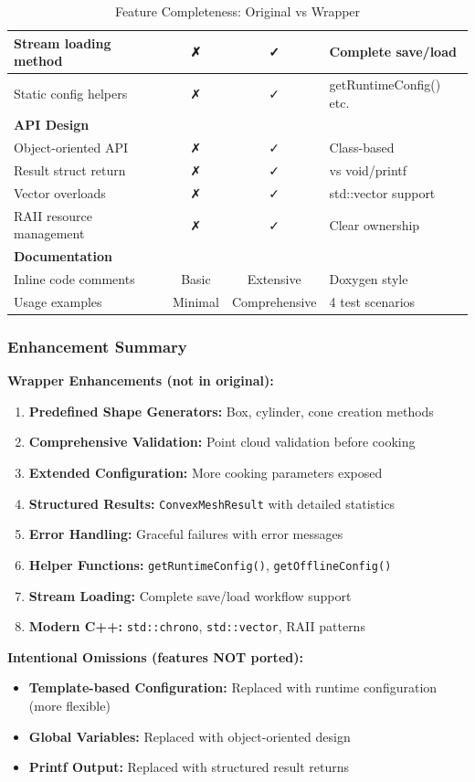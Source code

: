 \begin{table}[h]
\begin{tabular}{|p{6cm}|c|c|l|}
\hline
Stream loading method & ✗ & ✓ & Complete save/load \\
\hline
Static config helpers & ✗ & ✓ & getRuntimeConfig() etc. \\
\hline
\textbf{API Design} & & & \\
\hline
Object-oriented API & ✗ & ✓ & Class-based \\
\hline
Result struct return & ✗ & ✓ & vs void/printf \\
\hline
Vector overloads & ✗ & ✓ & std::vector support \\
\hline
RAII resource management & ✗ & ✓ & Clear ownership \\
\hline
\textbf{Documentation} & & & \\
\hline
Inline code comments & Basic & Extensive & Doxygen style \\
\hline
Usage examples & Minimal & Comprehensive & 4 test scenarios \\
\hline
\end{tabular}
\caption{Feature Completeness: Original vs Wrapper}
\end{table}

\subsubsection{Enhancement Summary}

\textbf{Wrapper Enhancements (not in original):}
\begin{enumerate}
    \item \textbf{Predefined Shape Generators:} Box, cylinder, cone creation methods
    \item \textbf{Comprehensive Validation:} Point cloud validation before cooking
    \item \textbf{Extended Configuration:} More cooking parameters exposed
    \item \textbf{Structured Results:} \texttt{ConvexMeshResult} with detailed statistics
    \item \textbf{Error Handling:} Graceful failures with error messages
    \item \textbf{Helper Functions:} \texttt{getRuntimeConfig()}, \texttt{getOfflineConfig()}
    \item \textbf{Stream Loading:} Complete save/load workflow support
    \item \textbf{Modern C++:} \texttt{std::chrono}, \texttt{std::vector}, RAII patterns
\end{enumerate}

\textbf{Intentional Omissions (features NOT ported):}
\begin{itemize}
    \item \textbf{Template-based Configuration:} Replaced with runtime configuration (more flexible)
    \item \textbf{Global Variables:} Replaced with object-oriented design
    \item \textbf{Printf Output:} Replaced with structured result returns
\end{itemize}

